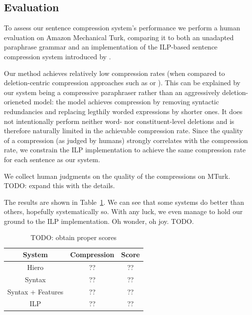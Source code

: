 \documentclass[11pt]{article}
\begin{document}
\subsection{Evaluation} \label{evaluation}

To assess our sentence compression system's performance we perform a
human evaluation on Amazon Mechanical Turk, comparing it to both an
unadapted paraphrase grammar and an implementation of the ILP-based
sentence compression system introduced by .

Our method achieves relatively low compression rates (when compared to
deletion-centric compression approaches such as 
or ). This can be explained by our system being a
compressive paraphraser rather than an aggressively deletion-orieneted
model: the model achieves compression by removing syntactic
redundancies and replacing legthily worded expressions by shorter
ones. It does not intentionally perform neither word- nor
constituent-level deletions and is therefore naturally limited in the
achievable compression rate. Since the quality of a compression (as
judged by humans) strongly correlates with the compression rate, we
constrain the ILP implementation to achieve the same compression rate
for each sentence as our system.

We collect human judgments on the quality of the compressions on
MTurk. TODO: expand this with the details.

The results are shown in Table~\ref{human_judgments}. We can see that
some systems do better than others, hopefully systematically so. With
any luck, we even manage to hold our ground to the ILP
implementation. Oh wonder, oh joy. TODO.

\begin{table}
\begin{center}
\begin{tabular}{|c|c|c|}
  \hline
  System & Compression & Score \\
  \hline
  Hiero & ?? & ?? \\
  Syntax & ?? & ?? \\
  Syntax + Features & ?? & ?? \\
  ILP & ?? & ?? \\
  \hline
\end{tabular}
\end{center}
\caption{TODO: obtain proper scores}
\label{human_judgments}
\end{table}
\end{document}
